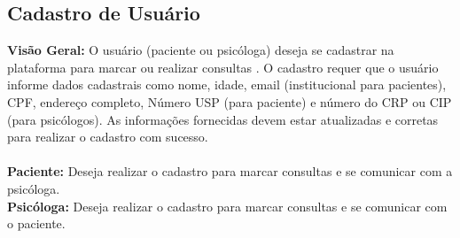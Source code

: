 \documentclass[a4paper,12pt]{report}
\begin{document}
\subsection{Cadastro de Usuário}
\textbf{Visão Geral:} O usuário (paciente ou psicóloga) deseja se cadastrar na plataforma para marcar ou realizar consultas . O cadastro requer que o usuário informe dados cadastrais como nome, idade, email (institucional para pacientes), CPF, endereço completo, Número USP (para paciente) e número do CRP ou CIP (para psicólogos). As informações fornecidas devem estar atualizadas e corretas para realizar o cadastro com sucesso.
\\
\\
\textbf{Paciente:} Deseja realizar o cadastro para marcar consultas e se comunicar com a psicóloga.
\\
\textbf{Psicóloga:} Deseja realizar o cadastro para marcar consultas e se comunicar com o paciente.
\\
\end{document}

